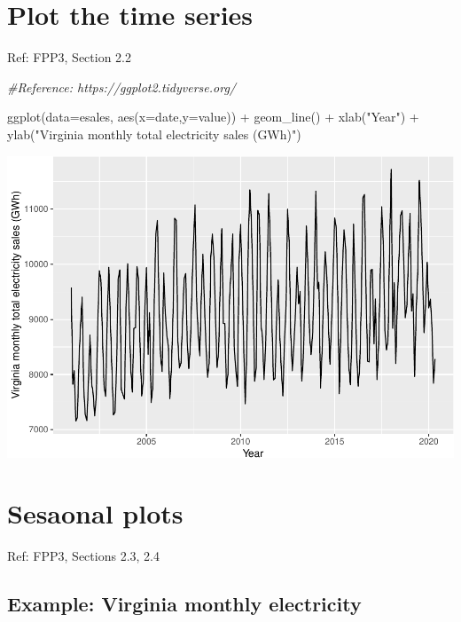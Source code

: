 \documentclass[
]{book}
\newenvironment{Shaded}{\begin{snugshade}}{\end{snugshade}}
\newcommand{\AttributeTok}[1]{\textcolor[rgb]{0.77,0.63,0.00}{#1}}
\newcommand{\CommentTok}[1]{\textcolor[rgb]{0.56,0.35,0.01}{\textit{#1}}}
\newcommand{\FunctionTok}[1]{\textcolor[rgb]{0.00,0.00,0.00}{#1}}
\newcommand{\NormalTok}[1]{#1}
\newcommand{\SpecialCharTok}[1]{\textcolor[rgb]{0.00,0.00,0.00}{#1}}
\newcommand{\StringTok}[1]{\textcolor[rgb]{0.31,0.60,0.02}{#1}}
\begin{document}
\hypertarget{plot-the-time-series}{%
\section{Plot the time series}\label{plot-the-time-series}}

Ref: FPP3, Section 2.2

\begin{Shaded}
\begin{Highlighting}[]
\CommentTok{\#Reference: https://ggplot2.tidyverse.org/}

\FunctionTok{ggplot}\NormalTok{(}\AttributeTok{data=}\NormalTok{esales, }\FunctionTok{aes}\NormalTok{(}\AttributeTok{x=}\NormalTok{date,}\AttributeTok{y=}\NormalTok{value)) }\SpecialCharTok{+}
  \FunctionTok{geom\_line}\NormalTok{() }\SpecialCharTok{+} \FunctionTok{xlab}\NormalTok{(}\StringTok{"Year"}\NormalTok{) }\SpecialCharTok{+} \FunctionTok{ylab}\NormalTok{(}\StringTok{"Virginia monthly total electricity sales (GWh)"}\NormalTok{)}
\end{Highlighting}
\end{Shaded}

\includegraphics{graphics/use ggplot2 to generate a plot-1.pdf}

\hypertarget{sesaonal-plots}{%
\section{Sesaonal plots}\label{sesaonal-plots}}

Ref: FPP3, Sections 2.3, 2.4

\hypertarget{example-virginia-monthly-electricity}{%
\subsection{Example: Virginia monthly electricity}\label{example-virginia-monthly-electricity}}
\end{document}
